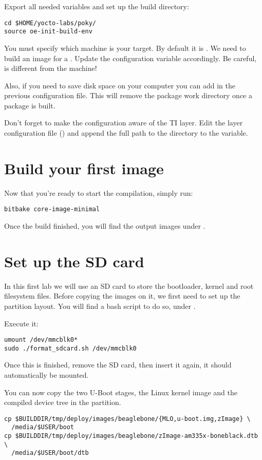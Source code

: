 Export all needed variables and set up the build directory:
\begin{verbatim}
cd $HOME/yocto-labs/poky/
source oe-init-build-env
\end{verbatim}

You must specify which machine is your target. By default it
is . We need to build an image for a .
Update the  configuration variable accordingly. Be
careful,  is different from the 
machine!

Also, if you need to save disk space on your computer you can add  in the previous configuration file. This will remove the
package work directory once a package is built.

Don't forget to make the configuration aware of the TI layer. Edit the
layer configuration file () and append the
full path to the  directory to the  variable.

\section{Build your first image}

Now that you're ready to start the compilation, simply run:
\begin{verbatim}
bitbake core-image-minimal
\end{verbatim}

Once the build finished, you will find the output images under
.

\section{Set up the SD card}

In this first lab we will use an SD card to store the bootloader, kernel and
root filesystem files. Before copying the images on it, we first need to set up the
partition layout. You will find a bash script to do so, under
.

Execute it:
\begin{verbatim}
umount /dev/mmcblk0*
sudo ./format_sdcard.sh /dev/mmcblk0
\end{verbatim}

Once this is finished, remove the SD card, then insert it again, it
should automatically be mounted.

You can now copy the two U-Boot stages, the Linux kernel image and the compiled
device tree in the  partition.
\begin{verbatim}
cp $BUILDDIR/tmp/deploy/images/beaglebone/{MLO,u-boot.img,zImage} \
  /media/$USER/boot
cp $BUILDDIR/tmp/deploy/images/beaglebone/zImage-am335x-boneblack.dtb \
  /media/$USER/boot/dtb
\end{verbatim}

